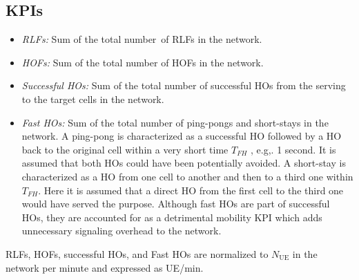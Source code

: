 \documentclass[10pt, conference]{IEEEtran}
\begin{document}
\subsection{KPIs} \label{Subsection5.1}
\begin{itemize}
    \item 
    \textit{RLFs:} Sum of the total number~of RLFs in the network.
    \item 
    \textit{HOFs:} Sum of the total number of HOFs in the network.
    \item 
    \textit{Successful HOs:} Sum of the total number of successful HOs from the serving  to the target cells in the network.
    \item 
    \textit{Fast HOs:} Sum of the total number of ping-pongs and short-stays in the network. A ping-pong is characterized as a successful HO followed by a HO back to the original cell within a very short time $T_{FH}$ \cite{b155}, e.g,. 1 second. It is assumed that both HOs could have been potentially avoided. A short-stay is characterized as a HO from one cell to another and then to a third one within $T_{FH}$. Here it is assumed that a direct HO from the first cell to the third one would have served the purpose. Although fast HOs are part of successful HOs, they are accounted for as a detrimental mobility KPI which adds unnecessary signaling overhead to the network.  
     

   \end{itemize}
   RLFs, HOFs, successful HOs, and Fast HOs are normalized to $N_\mathrm{UE}$ in the network per minute and expressed as UE/min.
\end{document}
